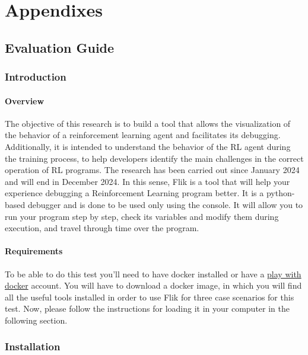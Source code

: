 
\chapter{Appendixes}
\label{sec:appendixe}

\section{Evaluation Guide}
\label{sec:eval-guide}

\subsection{Introduction}
\subsubsection{Overview}
The objective of this research is to build a tool that allows the visualization of the behavior of a reinforcement 
learning agent and facilitates its debugging. Additionally, it is intended to understand the behavior of the RL 
agent during the training process, to help developers identify the main challenges in the correct operation of 
RL programs. The research has been carried out since January 2024 and will end in December 2024.
In this sense, Flik is a tool that will help your experience debugging a Reinforcement Learning program better. 
It is a python-based debugger and is done to be used only using the console. It will allow you to run your 
program step by step, check its variables and modify them during execution, and travel through time over 
the program.

\subsubsection{Requirements}
To be able to do this test you'll need to have docker installed or have a \href{https://labs.play-with-docker.com/}{play with docker} 
account. You will have to download a docker image, in which you will find all the useful tools installed in order to 
use Flik for three case scenarios for this test. Now, please follow the instructions for loading it in your computer 
in the following section.

\subsection{Installation}

